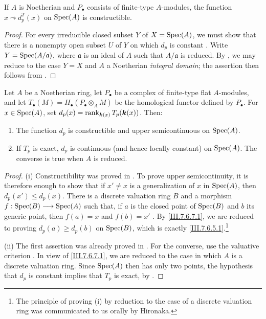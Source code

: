 \begin{lemma}[7.6.8]
\label{III.7.6.8}
If $A$ is Noetherian and $P_\bullet$ consists of finite-type
$A$-modules, the function $x\leadsto d_p^T(x)$ on $\operatorname{Spec}(A)$
is constructible.
\end{lemma}

\begin{proof}
For every irreducible closed subset $Y$ of
$X=\operatorname{Spec}(A)$, we must show that there is a nonempty open
subset $U$ of $Y$ on which $d_p$ is constant
.  Write $Y=\operatorname{Spec}(A/\mathfrak a)$, where
$\mathfrak a$ is an ideal of $A$ such that
$A/\mathfrak a$ is reduced.  By , we may
reduce to the case $Y=X$ and $A$ a Noetherian \emph{integral
domain}; the assertion then follows from .
\end{proof}

\begin{theorem}[7.6.9]
\label{III.7.6.9}
Let $A$ be a Noetherian ring, let $P_\bullet$ be a complex of
finite-type flat $A$-modules, and let $T_\bullet(M)=H_\bullet(P_\bullet\otimes_A M)$
be the homological functor defined by $P_\bullet$.  For
$x\in\operatorname{Spec}(A)$, set $d_p(x)=\operatorname{rank}_{\boldsymbol{k}(x)}T_p(\boldsymbol{k}(x))$.
Then:
\begin{enumerate}
  \item[\textup{(i)}] The function $d_p$ is constructible and upper
    semicontinuous on $\operatorname{Spec}(A)$.
  \item[\textup{(ii)}] If $T_p$ is exact, $d_p$ is continuous (and
    hence locally constant) on $\operatorname{Spec}(A)$.  The converse is
    true when $A$ is reduced.
\end{enumerate}
\end{theorem}

\begin{proof}
\textnormal{(i)}
Constructibility was proved in .  To prove
upper semicontinuity, it is therefore enough
 to show that if $x'\neq x$ is a
generalization of $x$ in $\operatorname{Spec}(A)$, then
$d_p(x')\leq d_p(x)$.  There is a discrete valuation ring
$B$ and a morphism $f:\operatorname{Spec}(B)\longrightarrow\operatorname{Spec}(A)$
such that, if $a$ is the closed point of $\operatorname{Spec}(B)$ and $b$
its generic point, then $f(a)=x$ and $f(b)=x'$
.  By \eqref{III.7.6.7.1}, we are reduced
to proving $d_p(a)\geq d_p(b)$ on $\operatorname{Spec}(B)$, which is exactly
\eqref{III.7.6.5.1}.\footnote{The principle of proving
\textnormal{(i)} by reduction to the case of a discrete
valuation ring was communicated to us orally by Hironaka.}

\medskip
\textnormal{(ii)}
The first assertion was already proved in
.  For the converse, use the valuative
criterion .  In view of
\eqref{III.7.6.7.1}, we are reduced to the case in which $A$
is a discrete valuation ring.  Since $\operatorname{Spec}(A)$ then has only
two points, the hypothesis that $d_p$ is constant implies
that $T_p$ is exact, by .
\end{proof}

